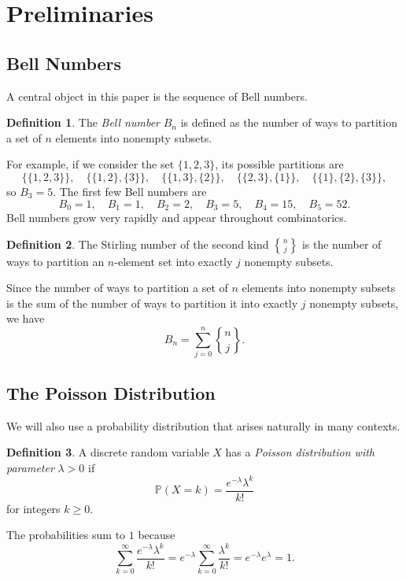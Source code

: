 \documentclass[12pt]{amsart}
\theoremstyle{plain}
\theoremstyle{definition}
\newtheorem{definition}{Definition}[section]
\theoremstyle{remark}
\newcommand{\PP}{\mathbb{P}}
\begin{document}
\section{Preliminaries}

\subsection{Bell Numbers}
A central object in this paper is the sequence of Bell numbers.

\begin{definition}
The \emph{Bell number} $B_n$ is defined as the number of ways to partition a set of $n$ elements into nonempty subsets.
\end{definition}

For example, if we consider the set $\{1, 2, 3\}$, its possible partitions are
$$\{\{1, 2, 3\}\}, \quad \{\{1, 2\}, \{3\}\}, \quad \{\{1, 3\}, \{2\}\}, \quad \{\{2, 3\}, \{1\}\}, \quad \{\{1\}, \{2\}, \{3\}\},$$
so $B_3 = 5$. The first few Bell numbers are
$$B_0 = 1, \quad B_1 = 1, \quad B_2 = 2, \quad B_3 = 5, \quad B_4 = 15, \quad B_5 = 52.$$
Bell numbers grow very rapidly and appear throughout combinatorics.

\begin{definition}
The Stirling number of the second kind $n \brace j$ is the number of ways to partition an $n$-element set into exactly $j$ nonempty subsets.
\end{definition}

Since the number of ways to partition a set of $n$ elements into nonempty subsets is the sum of the number of ways to partition it into exactly $j$ nonempty subsets, we have
$$B_n = \sum_{j = 0}^n {n \brace j}.$$

\subsection{The Poisson Distribution}
We will also use a probability distribution that arises naturally in many contexts.

\begin{definition}
A discrete random variable $X$ has a \emph{Poisson distribution with parameter} $\lambda > 0$ if
$$\PP(X = k) = \frac{e^{-\lambda}\lambda^k}{k!}$$
for integers $k \ge 0$.
\end{definition}

The probabilities sum to $1$ because
$$\sum_{k = 0}^\infty \frac{e^{-\lambda}\lambda^k}{k!} = e^{-\lambda}\sum_{k = 0}^\infty \frac{\lambda^k}{k!} = e^{-\lambda}e^\lambda = 1.$$
\end{document}
